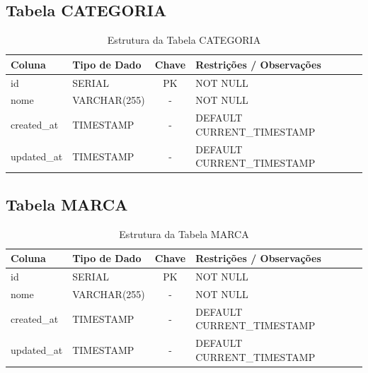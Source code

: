 \documentclass[
	12pt,				%
	openany,			%
	oneside,			%
	a4paper,			%
	english,			%
	french,				%
	spanish,			%
	brazil				%
	]{abntex2}
\begin{document}
\begin{apendicesenv}
\subsection{Tabela CATEGORIA}
\begin{table}[H]
\centering
\caption{Estrutura da Tabela CATEGORIA}
\begin{tabular}{|l|p{4cm}|c|p{6cm}|}
\hline
\textbf{Coluna} & \textbf{Tipo de Dado} & \textbf{Chave} & \textbf{Restrições / Observações} \\ \hline
id & SERIAL & PK & NOT NULL \\ \hline
nome & VARCHAR(255) & - & NOT NULL \\ \hline
created\_at & TIMESTAMP & - & DEFAULT CURRENT\_TIMESTAMP \\ \hline
updated\_at & TIMESTAMP & - & DEFAULT CURRENT\_TIMESTAMP \\ \hline
\end{tabular}
\end{table}

\subsection{Tabela MARCA}
\begin{table}[H]
\centering
\caption{Estrutura da Tabela MARCA}
\begin{tabular}{|l|p{4cm}|c|p{6cm}|}
\hline
\textbf{Coluna} & \textbf{Tipo de Dado} & \textbf{Chave} & \textbf{Restrições / Observações} \\ \hline
id & SERIAL & PK & NOT NULL \\ \hline
nome & VARCHAR(255) & - & NOT NULL \\ \hline
created\_at & TIMESTAMP & - & DEFAULT CURRENT\_TIMESTAMP \\ \hline
updated\_at & TIMESTAMP & - & DEFAULT CURRENT\_TIMESTAMP \\ \hline
\end{tabular}
\end{table}


\end{apendicesenv}
\end{document}
